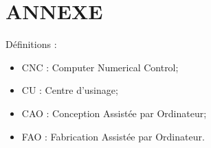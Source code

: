 \documentclass[12pt]{article}
\begin{document}




\newpage


\section{ANNEXE}
Définitions :
\begin{itemize}
    \item CNC : Computer Numerical Control;
    \item CU : Centre d'usinage;
    \item CAO : Conception Assistée par Ordinateur;
    \item FAO : Fabrication Assistée par Ordinateur.
\end{itemize}
\end{document}
